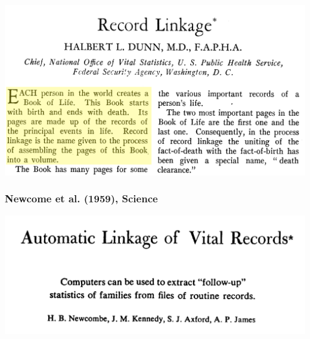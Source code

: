 \documentclass[compress]{beamer}
\newcommand{\1}[1]{\mathbb{I}\!\left[#1\right]} %
\theoremstyle{plain}
\begin{document}
\begin{frame}
    \begin{center}
        \includegraphics[width=\linewidth]{finalFigures/dunn}
    \end{center}
    

\end{frame}






\begin{frame}
\frametitle{Newcome et al. (1959), Science}


\begin{center}
    \includegraphics[width=\linewidth]{finalFigures/newcombe}
\end{center}
\end{frame}
\end{document}
